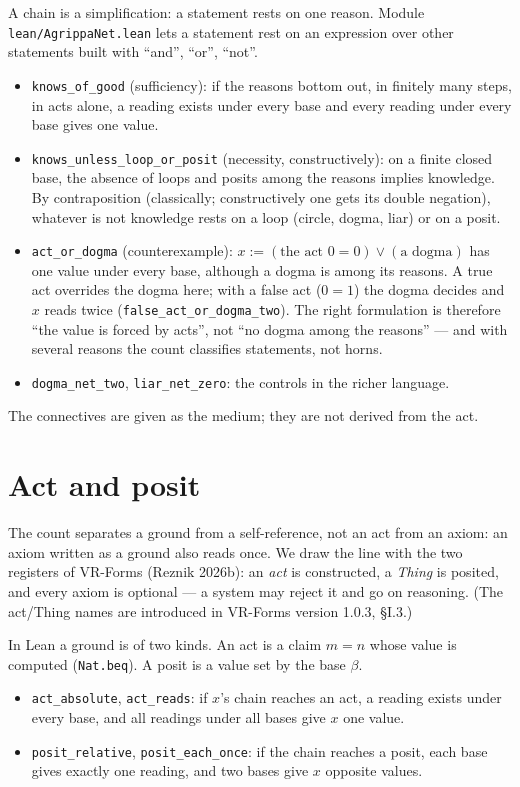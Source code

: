 \documentclass[11pt,a4paper]{article}
\newcommand{\code}[1]{\texttt{#1}}
\begin{document}
A chain is a simplification: a statement rests on one reason. Module \code{lean/AgrippaNet.lean} lets a statement
rest on an expression over other statements built with ``and'', ``or'', ``not''.
\begin{itemize}
\item \code{knows\_of\_good} (sufficiency): if the reasons bottom out, in finitely many steps, in acts alone, a reading
  exists under every base and every reading under every base gives one value.
\item \code{knows\_unless\_loop\_or\_posit} (necessity, constructively): on a finite closed base, the absence of loops
  and posits among the reasons implies knowledge. By contraposition (classically; constructively one gets
  its double negation), whatever is not knowledge rests on a loop (circle, dogma, liar) or on a posit.
\item \code{act\_or\_dogma} (counterexample): $x := (\text{the act } 0 = 0) \lor (\text{a dogma})$ has one value under
  every base, although a dogma is among its reasons. A true act overrides the dogma here; with a false act ($0 = 1$)
  the dogma decides and $x$ reads twice (\code{false\_act\_or\_dogma\_two}). The right formulation is therefore ``the value is forced by acts'',
  not ``no dogma among the reasons'' --- and with several reasons the count classifies statements, not horns.
\item \code{dogma\_net\_two}, \code{liar\_net\_zero}: the controls in the richer language.
\end{itemize}
The connectives are given as the medium; they are not derived from the act.

\section{Act and posit}

The count separates a ground from a self-reference, not an act from an axiom: an axiom written as a ground also reads
once. We draw the line with the two registers of VR-Forms (Reznik 2026b): an \emph{act} is constructed, a \emph{Thing}
is posited, and every axiom is optional --- a system may reject it and go on reasoning. (The act/Thing names are
introduced in VR-Forms version 1.0.3, §I.3.)

In Lean a ground is of two kinds. An act is a claim $m = n$ whose value is computed (\code{Nat.beq}). A posit is a value
set by the base $\beta$.
\begin{itemize}
\item \code{act\_absolute}, \code{act\_reads}: if $x$'s chain reaches an act, a reading exists under every base,
  and all readings under all bases give $x$ one value.
\item \code{posit\_relative}, \code{posit\_each\_once}: if the chain reaches a posit, each base gives exactly one
  reading, and two bases give $x$ opposite values.
\end{itemize}
\end{document}
